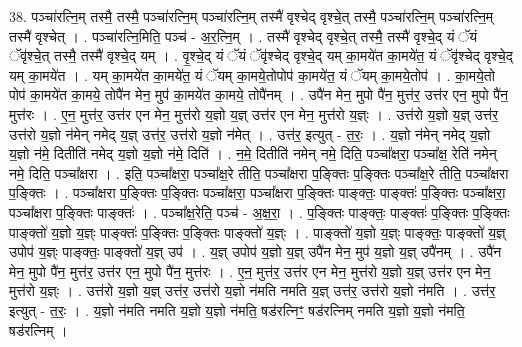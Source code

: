 \documentclass[17pt]{extarticle}
\begin{document}
38. पञ्चा॑रत्नि॒म् तस्मै॒ तस्मै॒ पञ्चा॑रत्नि॒म् पञ्चा॑रत्नि॒म् तस्मै॑ वृश्चेद् वृश्चे॒त् तस्मै॒ पञ्चा॑रत्नि॒म् पञ्चा॑रत्नि॒म् तस्मै॑ वृश्चेत् । . पञ्चा॑रत्नि॒मिति॒ पञ्च॑ - अ॒र॒त्नि॒म् । . तस्मै॑ वृश्चेद् वृश्चे॒त् तस्मै॒ तस्मै॑ वृश्चे॒द् यं ॅयं ॅवृ॑श्चे॒त् तस्मै॒ तस्मै॑ वृश्चे॒द् यम् । . वृ॒श्चे॒द् यं ॅयं ॅवृ॑श्चेद् वृश्चे॒द् यम् का॒मये॑त का॒मये॑त॒ यं ॅवृ॑श्चेद् वृश्चे॒द् यम् का॒मये॑त । . यम् का॒मये॑त का॒मये॑त॒ यं ॅयम् का॒मये॒तोपोप॑ का॒मये॑त॒ यं ॅयम् का॒मये॒तोप॑ । . का॒मये॒तो पोप॑ का॒मये॑त का॒मये॒ तोपै॑न मेन॒ मुप॑ का॒मये॑त का॒मये॒ तोपै॑नम् । . उपै॑न मेन॒ मुपो पै॑न॒ मुत्त॑र॒ उत्त॑र एन॒ मुपो पै॑न॒ मुत्त॑रः । . ए॒न॒ मुत्त॑र॒ उत्त॑र एन मेन॒ मुत्त॑रो य॒ज्ञो य॒ज्ञ् उत्त॑र एन मेन॒ मुत्त॑रो य॒ज्ञ्ः । . उत्त॑रो य॒ज्ञो य॒ज्ञ् उत्त॑र॒ उत्त॑रो य॒ज्ञो न॑मेन् नमेद् य॒ज्ञ् उत्त॑र॒ उत्त॑रो य॒ज्ञो न॑मेत् । . उत्त॑र॒ इत्युत् - त॒रः॒ । . य॒ज्ञो न॑मेन् नमेद् य॒ज्ञो य॒ज्ञो न॑मे॒ दितीति॑ नमेद् य॒ज्ञो य॒ज्ञो न॑मे॒ दिति॑ । . न॒मे॒ दितीति॑ नमेन् नमे॒ दिति॒ पञ्चा᳚क्षरा॒ पञ्चा᳚क्ष॒ रेति॑ नमेन् नमे॒ दिति॒ पञ्चा᳚क्षरा । . इति॒ पञ्चा᳚क्षरा॒ पञ्चा᳚क्ष॒रे तीति॒ पञ्चा᳚क्षरा प॒ङ्क्तिः प॒ङ्क्तिः पञ्चा᳚क्ष॒रे तीति॒ पञ्चा᳚क्षरा प॒ङ्क्तिः । . पञ्चा᳚क्षरा प॒ङ्क्तिः प॒ङ्क्तिः पञ्चा᳚क्षरा॒ पञ्चा᳚क्षरा प॒ङ्क्तिः पाङ्क्तः॒ पाङ्क्तः॑ प॒ङ्क्तिः पञ्चा᳚क्षरा॒ पञ्चा᳚क्षरा प॒ङ्क्तिः पाङ्क्तः॑ । . पञ्चा᳚क्ष॒रेति॒ पञ्च॑ - अ॒क्ष॒रा॒ । . प॒ङ्क्तिः पाङ्क्तः॒ पाङ्क्तः॑ प॒ङ्क्तिः प॒ङ्क्तिः पाङ्क्तो॑ य॒ज्ञो य॒ज्ञ्ः पाङ्क्तः॑ प॒ङ्क्तिः प॒ङ्क्तिः पाङ्क्तो॑ य॒ज्ञ्ः । . पाङ्क्तो॑ य॒ज्ञो य॒ज्ञ्ः पाङ्क्तः॒ पाङ्क्तो॑ य॒ज्ञ् उपोप॑ य॒ज्ञ्ः पाङ्क्तः॒ पाङ्क्तो॑ य॒ज्ञ् उप॑ । . य॒ज्ञ् उपोप॑ य॒ज्ञो य॒ज्ञ् उपै॑न मेन॒ मुप॑ य॒ज्ञो य॒ज्ञ् उपै॑नम् । . उपै॑न मेन॒ मुपो पै॑न॒ मुत्त॑र॒ उत्त॑र एन॒ मुपो पै॑न॒ मुत्त॑रः । . ए॒न॒ मुत्त॑र॒ उत्त॑र एन मेन॒ मुत्त॑रो य॒ज्ञो य॒ज्ञ् उत्त॑र एन मेन॒ मुत्त॑रो य॒ज्ञ्ः । . उत्त॑रो य॒ज्ञो य॒ज्ञ् उत्त॑र॒ उत्त॑रो य॒ज्ञो न॑मति नमति य॒ज्ञ् उत्त॑र॒ उत्त॑रो य॒ज्ञो न॑मति । . उत्त॑र॒ इत्युत् - त॒रः॒ । . य॒ज्ञो न॑मति नमति य॒ज्ञो य॒ज्ञो न॑मति॒ षड॑रत्निꣳ॒॒ षड॑रत्निम् नमति य॒ज्ञो य॒ज्ञो न॑मति॒ षड॑रत्निम् । \newline
\pagebreak
{}
\end{document}

